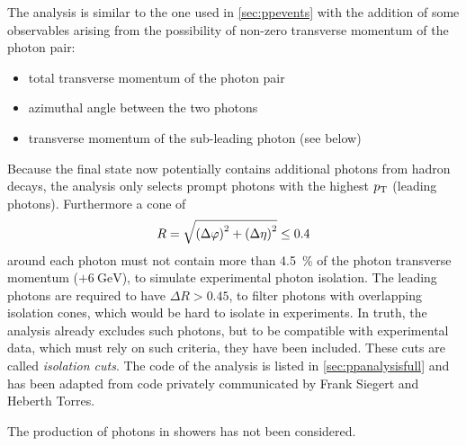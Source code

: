 The analysis is similar to the one used in \cref{sec:ppevents} with
the addition of some observables arising from the possibility of
non-zero transverse momentum of the photon pair:
%
\begin{itemize}
\item total transverse momentum of the photon pair
\item azimuthal angle between the two photons
\item transverse momentum of the sub-leading photon (see below)
\end{itemize}
%
Because the final state now potentially contains additional photons
from hadron decays, the analysis only selects prompt photons with the
highest \(p_\mathrm{T}\) (leading photons). Furthermore a cone of
\[R = \sqrt{\qty(\Delta\varphi)^2 + \qty(\Delta\eta)^2} \leq 0.4\]
around each photon must not contain more than \SI{4.5}{\percent} of
the photon transverse momentum (\(+ \SI{6}{\giga\electronvolt}\)), to
simulate experimental photon isolation. The leading photons are
required to have \(\Delta R > 0.45\), to filter photons with
overlapping isolation cones, which would be hard to isolate in
experiments. In truth, the analysis already excludes such photons,
but to be compatible with experimental data, which must rely on such
criteria, they have been included. These cuts are called
\emph{isolation cuts}. The code of the analysis is listed in
\cref{sec:ppanalysisfull} and has been adapted from code privately
communicated by Frank Siegert and Heberth Torres.

The production of photons in showers has not been considered.

